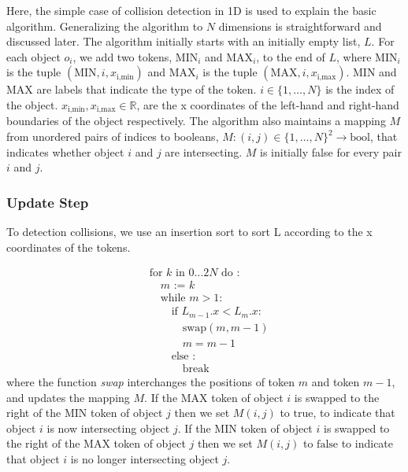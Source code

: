 \documentclass[11pt]{article} %
\begin{document}
Here, the simple case of collision detection in 1D is used to explain
the basic algorithm. Generalizing the algorithm to $N$ dimensions
is straightforward and discussed later. The algorithm initially starts
with an initially empty list, $L$. For each object $o_{i}$, we add
two tokens, $\text{MIN}_{i}$ and $\text{MAX}_{i}$, to the end of
$L$, where $\text{MIN}_{i}$ is the tuple $(\text{MIN},i,x_{\text{i},\text{min}})$
and $\text{MAX}_{i}$ is the tuple $(\text{MAX},i,x_{\text{i},\text{max}})$.
$\text{MIN}$ and $\text{MAX}$ are labels that indicate the type
of the token. $i\in\{1,\ldots,N\}$ is the index of the object. $x_{\text{i},\text{min}},x_{\text{i},\text{max}}\in\mathbb{R}$,
are the x coordinates of the left-hand and right-hand boundaries of
the object respectively. The algorithm also maintains a mapping $M$
from unordered pairs of indices to booleans, $M:(i,j)\in\{1,\ldots,N\}^{2}\rightarrow\text{bool}$,
that indicates whether object $i$ and $j$ are intersecting. $M$
is initially false for every pair $i$ and $j$.

\subsubsection{Update Step}

To detection collisions, we use an insertion sort to sort L according
to the x coordinates of the tokens. 

\[
\begin{aligned} & \text{for }k\text{ in }0\ldots2N\text{ do : }\\
 & \quad m\text{ := }k\\
 & \quad\text{while }m>1:\\
 & \quad\quad\text{if }L_{m-1}.x<L_{m}.x:\\
 & \quad\quad\quad\text{swap}(m,m-1)\\
 & \quad\quad\quad m=m-1\\
 & \quad\quad\text{else :}\\
 & \quad\quad\quad\text{break}
\end{aligned}
\]
where the function \emph{swap} interchanges the positions of token
$m$ and token $m-1$, and updates the mapping $M$. If the $\text{MAX}$
token of object $i$ is swapped to the right of the $\text{MIN}$
token of object $j$ then we set $M(i,j)$ to $\text{true}$, to indicate
that object $i$ is now intersecting object $j$. If the $\text{MIN}$
token of object $i$ is swapped to the right of the $\text{MAX}$
token of object $j$ then we set $M(i,j)$ to $\text{false}$ to indicate
that object $i$ is no longer intersecting object $j$. 
\end{document}
